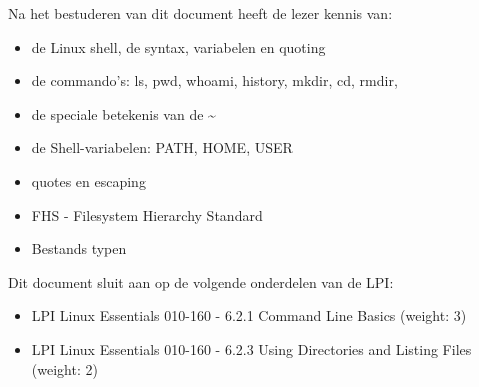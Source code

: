 Na het bestuderen van dit document heeft de lezer kennis van:
\begin{itemize}
\item de Linux shell, de syntax, variabelen en quoting
\item de commando's: ls, pwd, whoami, history, mkdir, cd, rmdir,
\item de speciale betekenis van de \textasciitilde
\item de Shell-variabelen: PATH, HOME, USER
\item quotes en escaping
\item FHS - Filesystem Hierarchy Standard
\item Bestands typen
\end{itemize}

Dit document sluit aan op de volgende onderdelen van de LPI:
\begin{itemize}
\item LPI Linux Essentials 010-160 - 6.2.1 Command Line Basics (weight: 3)
\item LPI Linux Essentials 010-160 - 6.2.3 Using Directories and Listing Files (weight: 2)
\end{itemize}
